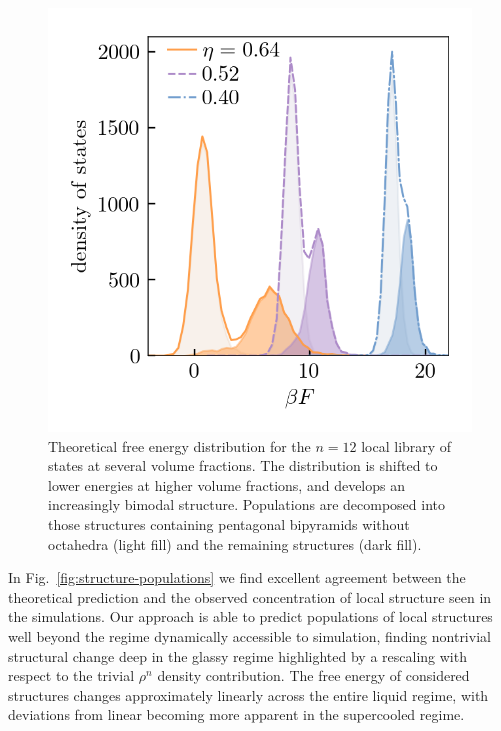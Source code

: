 \documentclass[11pt,twoside]{report}
\begin{document}
\begin{figure}
  \includegraphics[width=0.9\linewidth,outer]{n12-dos}
  \caption[Free energy distribution of 12 particle structures]{
    Theoretical free energy distribution for the $n=12$ local library of states at several volume fractions.
    The distribution is shifted to lower energies at higher volume fractions, and develops an increasingly bimodal structure.
    Populations are decomposed into those structures containing pentagonal bipyramids without octahedra (light fill) and the remaining structures (dark fill).
  }
  \label{fig:n12-dos}
\end{figure}

In Fig.\ \ref{fig:structure-populations} we find excellent agreement between the theoretical prediction and the observed concentration of local structure seen in the simulations.
Our approach is able to predict populations of local structures well beyond the regime dynamically accessible to simulation, finding nontrivial structural change deep in the glassy regime highlighted by a rescaling with respect to the trivial $\rho^n$ density contribution.
The free energy of considered structures changes approximately linearly across the entire liquid regime, with deviations from linear becoming more apparent in the supercooled regime.
\end{document}

